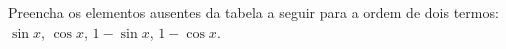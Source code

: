 Preencha os elementos ausentes da tabela a seguir para a ordem de dois termos: $\sin x$, $\cos x$, $1 - \sin x$, $1 - \cos x$.


